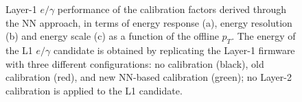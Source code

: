 \begin{figure}
    \centering
    
    \caption{Layer-1 $e/\gamma$ performance of the calibration factors derived through the NN approach, in terms of energy response (a), energy resolution (b) and energy scale (c) as a function of the offline $p_T$. The energy of the L1 $e/\gamma$ candidate is obtained by replicating the Layer-1 firmware with three different configurations: no calibration (black), old calibration (red), and new NN-based calibration (green); no Layer-2 calibration is applied to the L1 candidate.}
    \label{fig:NN_ECAL_Response}
\end{figure}

